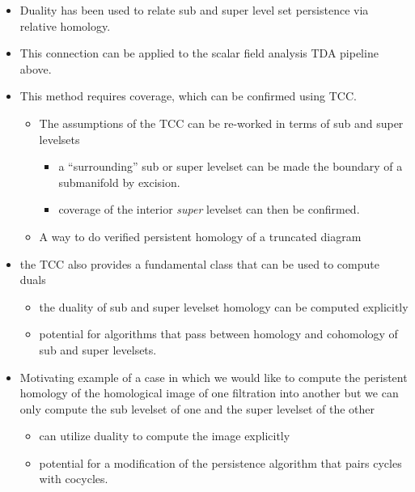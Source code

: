 
\begin{itemize}
  \item Duality has been used to relate sub and super level set persistence via relative homology.
  \item This connection can be applied to the scalar field analysis TDA pipeline above.
  \item This method requires coverage, which can be confirmed using TCC.
  \begin{itemize}
    \item The assumptions of the TCC can be re-worked in terms of sub and super levelsets
    \begin{itemize}
      \item a ``surrounding'' sub or super levelset can be made the boundary of a submanifold by excision.
      \item coverage of the interior \emph{super} levelset can then be confirmed.
    \end{itemize}
    \item A way to do verified persistent homology of a truncated diagram
  \end{itemize}
  \item the TCC also provides a fundamental class that can be used to compute duals
  \begin{itemize}
    \item the duality of sub and super levelset homology can be computed explicitly
    \item potential for algorithms that pass between homology and cohomology of sub and super levelsets.
  \end{itemize}
  \item Motivating example of a case in which we would like to compute the peristent homology of the homological image of one filtration into another but we can only compute the sub levelset of one and the super levelset of the other
  \begin{itemize}
    \item can utilize duality to compute the image explicitly
    \item potential for a modification of the persistence algorithm that pairs cycles with cocycles.
  \end{itemize}
\end{itemize}
